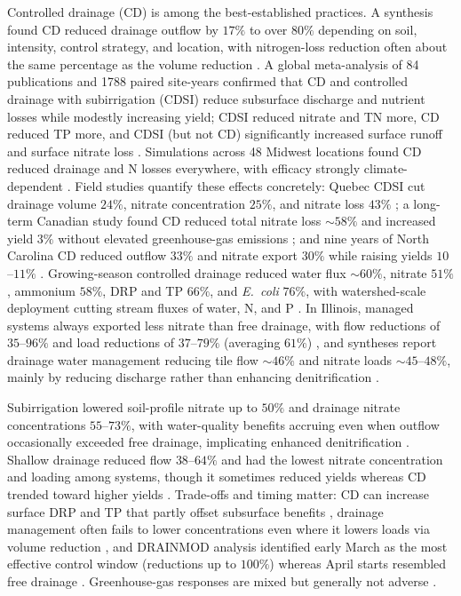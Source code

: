 \documentclass[11pt]{article}
\begin{document}
Controlled drainage (CD) is among the best-established practices. A synthesis
found CD reduced drainage outflow by $17\%$ to over $80\%$ depending on soil,
intensity, control strategy, and location, with nitrogen-loss reduction
often about the same percentage as the volume reduction
\parencite{Skaggs2010}. A global meta-analysis of 84 publications and 1788
paired site-years confirmed that CD and controlled drainage with
subirrigation (CDSI) reduce subsurface discharge and nutrient losses while
modestly increasing yield; CDSI reduced nitrate and TN more, CD reduced TP
more, and CDSI (but not CD) significantly increased surface runoff and
surface nitrate loss \parencite{Wu2025}. Simulations across 48 Midwest
locations found CD reduced drainage and N losses everywhere, with efficacy
strongly climate-dependent \parencite{Youssef2018}. Field studies quantify
these effects concretely: Quebec CDSI cut drainage volume $24\%$, nitrate
concentration $25\%$, and nitrate loss $43\%$ \parencite{Ng2000}; a long-term
Canadian study found CD reduced total nitrate loss $\sim58\%$ and increased
yield $3\%$ without elevated greenhouse-gas emissions
\parencite{Madramootoo2024}; and nine years of North Carolina CD reduced
outflow $33\%$ and nitrate export $30\%$ while raising yields $10$--$11\%$
\parencite{Poole2018}. Growing-season controlled drainage reduced water flux
$\sim60\%$, nitrate $51\%$, ammonium $58\%$, DRP and TP $66\%$, and
\emph{E.\ coli} $76\%$, with watershed-scale deployment cutting stream fluxes
of water, N, and P \parencite{Sunohara2016,Sunohara2015}. In Illinois, managed
systems always exported less nitrate than free drainage, with flow reductions
of $35$--$96\%$ and load reductions of $37$--$79\%$ (averaging $61\%$)
\parencite{Cooke2012}, and syntheses report drainage water management reducing
tile flow $\sim46\%$ and nitrate loads $\sim45$--$48\%$, mainly by reducing
discharge rather than enhancing denitrification
\parencite{Ross2016,Ward2018}.

Subirrigation lowered soil-profile nitrate up to $50\%$ and drainage nitrate
concentrations $55$--$73\%$, with water-quality benefits accruing even when
outflow occasionally exceeded free drainage, implicating enhanced
denitrification \parencite{Elmi2004,Elmi2002,Noory2009}. Shallow drainage
reduced flow $38$--$64\%$ and had the lowest nitrate concentration and
loading among systems, though it sometimes reduced yields whereas CD trended
toward higher yields \parencite{Smith2019,Smith2011b}. Trade-offs and timing
matter: CD can increase surface DRP and TP that partly offset subsurface
benefits \parencite{King2022,Wu2025}, drainage management often fails to
lower concentrations even where it lowers loads via volume reduction
\parencite{Grenon2023,Wesström2014}, and DRAINMOD analysis identified early
March as the most effective control window (reductions up to $100\%$) whereas
April starts resembled free drainage \parencite{Kesicka2023c}. Greenhouse-gas
responses are mixed but generally not adverse
\parencite{Madramootoo2024,Smith2019}.
\end{document}
